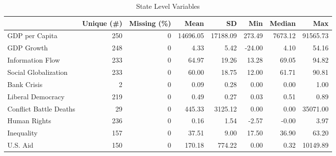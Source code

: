 \documentclass[12pt]{article}
\begin{document}
\begin{table}
\caption{\label{tab:state-vars}State Level Variables}
\begin{adjustbox}{width= .95\textwidth, center}
\begin{tabular}[t]{lrrrrrrr}
\toprule
  & Unique (\#) & Missing (\%) & Mean & SD & Min & Median & Max\\
\midrule
GDP per Capita & 250 & 0 & 14696.05 & 17188.09 & 273.49 & 7673.12 & 91565.73\\
GDP Growth & 248 & 0 & 4.33 & 5.42 & -24.00 & 4.10 & 54.16\\
Information Flow & 233 & 0 & 64.97 & 19.26 & 13.28 & 69.05 & 94.82\\
Social Globalization & 233 & 0 & 60.00 & 18.75 & 12.00 & 61.71 & 90.81\\
Bank Crisis & 2 & 0 & 0.09 & 0.28 & 0.00 & 0.00 & 1.00\\
Liberal Democracy & 219 & 0 & 0.49 & 0.27 & 0.03 & 0.51 & 0.89\\
Conflict Battle Deaths & 29 & 0 & 445.33 & 3125.12 & 0.00 & 0.00 & 35071.00\\
Human Rights & 236 & 0 & 0.16 & 1.54 & -2.57 & -0.00 & 3.97\\
Inequality & 157 & 0 & 37.51 & 9.00 & 17.50 & 36.90 & 63.20\\
U.S. Aid & 150 & 0 & 170.18 & 774.22 & 0.00 & 0.32 & 10149.89\\
\bottomrule
\end{tabular}
\end{adjustbox}
\end{table}
\end{document}
